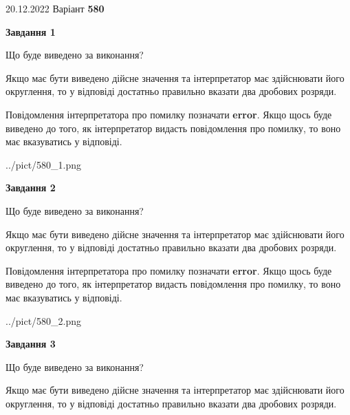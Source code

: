 \documentclass[12pt, ukrainian]{article}
\begin{document}
{20.12.2022 Варіант \No \textbf { 580 }\par}
{
\begin {Large}

{\begin {center}\textbf{Завдання 1}\end {center}}\par
Що буде виведено за виконання? \par

Якщо має бути виведено дійсне значення та інтерпретатор має здійснювати його округлення, 
то у відповіді достатньо правильно вказати два дробових розряди.

Повідомлення інтерпретатора про помилку позначати \textbf{error}.
Якщо щось буде виведено до того, як інтерпретатор видасть повідомлення про помилку, 
то воно має вказуватись у відповіді. \par

\begin{center}
	{../pict/580_1.png}
\end{center}
\newpage

{\begin {center}\textbf{Завдання 2}\end {center}}\par
Що буде виведено за виконання? \par

Якщо має бути виведено дійсне значення та інтерпретатор має здійснювати його округлення, 
то у відповіді достатньо правильно вказати два дробових розряди.

Повідомлення інтерпретатора про помилку позначати \textbf{error}.
Якщо щось буде виведено до того, як інтерпретатор видасть повідомлення про помилку, 
то воно має вказуватись у відповіді. \par

\begin{center}
	{../pict/580_2.png}
\end{center}
\newpage

{\begin {center}\textbf{Завдання 3}\end {center}}\par
Що буде виведено за виконання? \par

Якщо має бути виведено дійсне значення та інтерпретатор має здійснювати його округлення, 
то у відповіді достатньо правильно вказати два дробових розряди.


\end{Large}}
\end{document}
